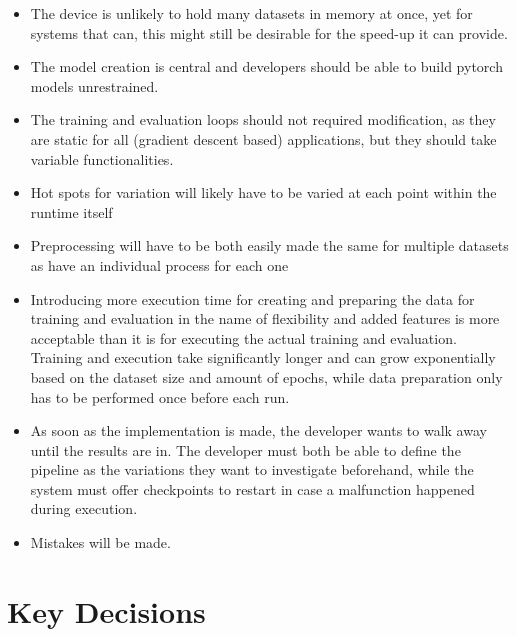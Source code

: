 \begin{itemize}
	\item The device is unlikely to hold many datasets in memory at once, yet for systems that can, this might still be desirable for the speed-up it can provide. 
	\item The model creation is central and developers should be able to build pytorch models unrestrained. 
	\item The training and evaluation loops should not required modification, as they are static for all (gradient descent based) applications, but they should take variable functionalities.
	\item Hot spots for variation will likely have to be varied at each point within the runtime itself
	\item Preprocessing will have to be both easily made the same for multiple datasets as have an individual process for each one
	\item Introducing more execution time for creating and preparing the data for training and evaluation in the name of flexibility and added features is more acceptable than it is for executing the actual training and evaluation. Training and execution take significantly longer and can grow exponentially based on the dataset size and amount of epochs, while data preparation only has to be performed once before each run.
	\item As soon as the implementation is made, the developer wants to walk away until the results are in. The developer must both be able to define the pipeline as the variations they want to investigate beforehand, while the system must offer checkpoints to restart in case a malfunction happened during execution.
	\item Mistakes will be made.
\end{itemize}


\section{Key Decisions}


